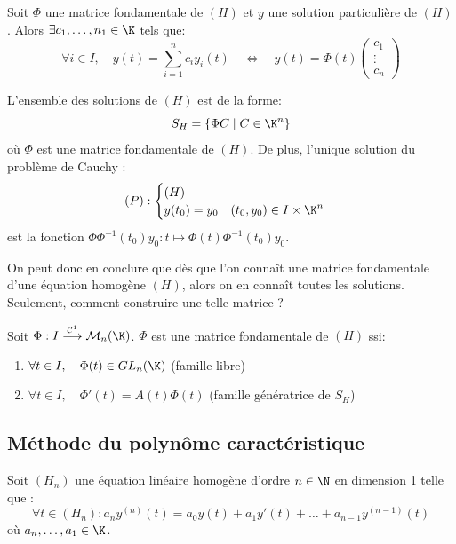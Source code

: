 Soit $\Phi$ une matrice fondamentale de $(H)$ et $y$ une solution particulière de $(H)$.
Alors $ \exists c_1, \dots, n_1 \in  \K$ tels que: 
	\[ \forall i \in  I, \quad y(t) = \sum_{i=1}^{n} c_i y_i(t) \quad \iff \quad y(t) = \Phi(t) 
		\begin{pmatrix}
			c_1 \\ 
			\vdots \\
			c_n 
		\end{pmatrix} \] 

\begin{proposition}
	L'ensemble des solutions de $(H)$ est de la forme: 
		\[ S_H = \{ \Phi C \; | \; C \in  \K^n \} \] 
	où $\Phi$ est une matrice fondamentale de $(H)$. De plus, l'unique solution 
	du problème de Cauchy :
		\[ (P) : \begin{cases}
				(H) \\ 
				y(t_0) = y_0 \quad (t_0, y_0) \in  I \times \K^n
			\end{cases} \]
	est la fonction $ \Phi \Phi^{-1} (t_0) y_0 : t \longmapsto \Phi(t) \Phi^{-1}(t_0) y_0$.  
\end{proposition} 

On peut donc en conclure que dès que l'on connaît une matrice fondamentale 
d'une équation homogène $(H)$, alors on en connaît toutes les solutions. 
Seulement, comment construire une telle matrice ? 

\begin{prop} 
	Soit $\Phi : I \overset{ \mathcal{C}^1}{\longrightarrow} \mathcal{M}_n(\K)$. $\Phi$ est 
	une matrice fondamentale de $(H)$ ssi:
	\begin{enumerate} 
		\item $ \forall t \in  I, \quad \Phi(t) \in  GL_n(\K) $ (famille libre) 
		\item $ \forall t \in  I, \quad \Phi '(t) = A(t) \Phi(t) $ (famille génératrice de $S_H$)
	\end{enumerate} 
\end{prop} 

\subsection{Méthode du polynôme caractéristique} 

Soit $(H_n)$ une équation linéaire homogène d'ordre $n \in  \N$ en dimension 1 telle que : 
	\[ \forall t \in (H_n) : a_n y^{(n)}(t) = a_0 y(t) + a_1 y'(t) + \dots + a_{n-1} y^{(n-1)}(t) \]
où $ a_n, \dots, a_1 \in  \K$. 

